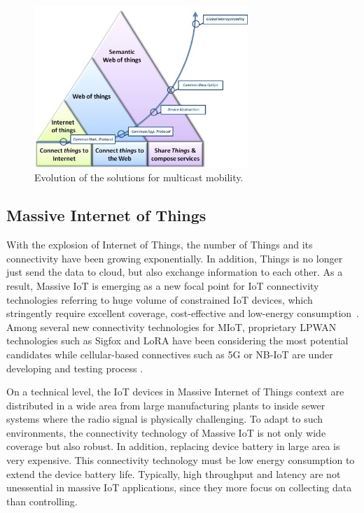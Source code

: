 \begin{figure}[h!] 
 \begin{center} 
 \includegraphics[width=0.72\textwidth]{./Part1/Chapter2/figures/c3_evolution_iot_swot.jpg} 
    \caption{Evolution of the solutions for multicast mobility.~\cite{jara2014semantic}}
     \label{fig:c2_evolution_iot_swot}
  \end{center} 
\end{figure}

\subsection{Massive Internet of Things}
With the explosion of Internet of Things, the number of Things and its connectivity have been growing exponentially. In addition, Things is no longer just send the data to cloud, but also exchange information to each other. As a result, Massive IoT is emerging as a new focal point for IoT connectivity technologies referring to huge volume of constrained IoT devices, which stringently require excellent coverage, cost-effective and low-energy consumption~\cite{Northstream2017}. Among several new connectivity technologies for MIoT, proprietary LPWAN technologies such as Sigfox and LoRA have been considering the most potential candidates while cellular-based connectives such as 5G or NB-IoT are under developing and testing process \cite{raza2017low}.

On a technical level, the IoT devices in Massive Internet of Things context are distributed in a wide area from large manufacturing plants to inside sewer systems where the radio signal is physically challenging. To adapt to such environments, the connectivity technology of Massive IoT is not only wide coverage but also robust. In addition, replacing device battery in large area is very expensive. This connectivity technology must be low energy consumption to extend the device battery life. Typically, high throughput and latency are not unessential in massive IoT applications, since they more focus on collecting data than controlling.


